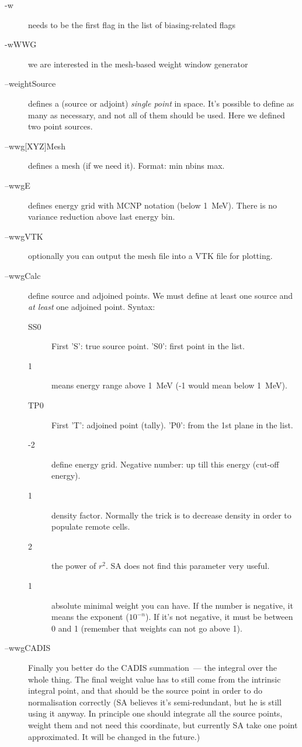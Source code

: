 \begin{description}
\item[-w] needs to be the first flag in the list of biasing-related flags
\item[-wWWG] we are interested in the mesh-based weight window generator
\item[--weightSource] defines a (source or adjoint) {\em single point} in space. It's possible to define as many as necessary, and not all of them should be used.
  Here we defined two point sources.
\item[--wwg{[XYZ]}Mesh] defines a mesh (if we need it). Format: min nbins max.
\item[--wwgE] defines energy grid with MCNP notation (below \SI{1}{\mega\electronvolt}). There is no variance reduction above last energy bin.
\item[--wwgVTK] optionally you can output the mesh file into a VTK file for plotting.
\item[--wwgCalc] define source and adjoined points. We must define at least one source and {\em at least} one adjoined point.
  Syntax:
  \begin{description}
  \item[SS0] First 'S': true source point. 'S0': first point in the list.
  \item[1] means energy range above \SI{1}{\mega\electronvolt} (-1 would mean below \SI{1}{\mega\electronvolt}).
  \item[TP0] First 'T': adjoined point (tally). 'P0': from the 1st plane in the list.
  \item[-2] define energy grid. Negative number: up till this energy (cut-off energy).
  \item[1] density factor. Normally the trick is to decrease density in order to populate remote cells.
  \item[2] the power of $r^2$. SA does not find this parameter very useful.
  \item[1] absolute minimal weight you can have. If the number is negative, it means the exponent ($10^{-n}$). If it's not negative, it must be between 0 and 1 (remember that weights can not go above 1).
  \end{description}
\item[--wwgCADIS] Finally you better do the CADIS summation~--- the integral over the whole thing. The final weight value has to still
  come from the intrinsic integral point, and that should be the source point in order to do normalisation correctly (SA believes it's semi-redundant, but he is still using it anyway. In principle one should integrate all the source points, weight them and not need this coordinate, but currently SA take one point approximated. It will be changed in the future.)
\end{description}

